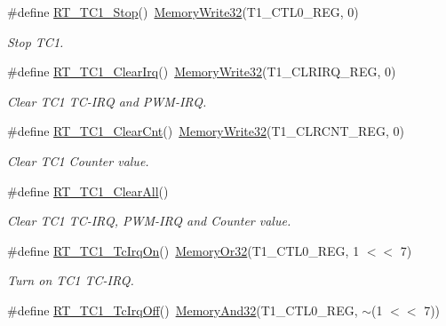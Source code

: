 \begin{DoxyCompactItemize}
\item 
\#define \mbox{\hyperlink{a00044_ade1093a6b28016a59b5e5b0c2733ab2c}{R\+T\+\_\+\+T\+C1\+\_\+\+Stop}}()~\mbox{\hyperlink{a00020_ad9953f631a539cfaa35baf94f878b3ec}{Memory\+Write32}}(T1\+\_\+\+C\+T\+L0\+\_\+\+R\+EG, 0)
\begin{DoxyCompactList}\small\item\em Stop T\+C1. \end{DoxyCompactList}\item 
\#define \mbox{\hyperlink{a00044_ab9c21242bf3ba2144aa45a336a4dc7ea}{R\+T\+\_\+\+T\+C1\+\_\+\+Clear\+Irq}}()~\mbox{\hyperlink{a00020_ad9953f631a539cfaa35baf94f878b3ec}{Memory\+Write32}}(T1\+\_\+\+C\+L\+R\+I\+R\+Q\+\_\+\+R\+EG, 0)
\begin{DoxyCompactList}\small\item\em Clear T\+C1 T\+C-\/\+I\+RQ and P\+W\+M-\/\+I\+RQ. \end{DoxyCompactList}\item 
\#define \mbox{\hyperlink{a00044_abcd4f7c1a53b5d0a31f45076725a1ed6}{R\+T\+\_\+\+T\+C1\+\_\+\+Clear\+Cnt}}()~\mbox{\hyperlink{a00020_ad9953f631a539cfaa35baf94f878b3ec}{Memory\+Write32}}(T1\+\_\+\+C\+L\+R\+C\+N\+T\+\_\+\+R\+EG, 0)
\begin{DoxyCompactList}\small\item\em Clear T\+C1 Counter value. \end{DoxyCompactList}\item 
\#define \mbox{\hyperlink{a00044_a2a7757de241add69f5fffc4e1dfa431a}{R\+T\+\_\+\+T\+C1\+\_\+\+Clear\+All}}()
\begin{DoxyCompactList}\small\item\em Clear T\+C1 T\+C-\/\+I\+RQ, P\+W\+M-\/\+I\+RQ and Counter value. \end{DoxyCompactList}\item 
\#define \mbox{\hyperlink{a00044_adbef657c94c7b32f07e4210fbf7f4745}{R\+T\+\_\+\+T\+C1\+\_\+\+Tc\+Irq\+On}}()~\mbox{\hyperlink{a00020_a9ea92ebccdef6bdaca4d00210cc7266d}{Memory\+Or32}}(T1\+\_\+\+C\+T\+L0\+\_\+\+R\+EG, 1 $<$$<$ 7)
\begin{DoxyCompactList}\small\item\em Turn on T\+C1 T\+C-\/\+I\+RQ. \end{DoxyCompactList}\item 
\#define \mbox{\hyperlink{a00044_ad8775d32f1b8cb982c2abf045e3b6b95}{R\+T\+\_\+\+T\+C1\+\_\+\+Tc\+Irq\+Off}}()~\mbox{\hyperlink{a00020_a5c1a2bd4c1bd4c2f429d8042a45327ff}{Memory\+And32}}(T1\+\_\+\+C\+T\+L0\+\_\+\+R\+EG, $\sim$(1 $<$$<$ 7))

\end{DoxyCompactItemize}
